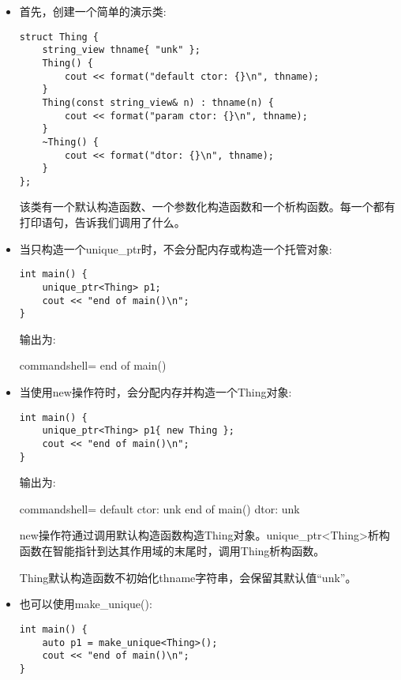 \begin{itemize}
\item 
首先，创建一个简单的演示类:

\begin{lstlisting}[style=styleCXX]
struct Thing {
	string_view thname{ "unk" };
	Thing() {
		cout << format("default ctor: {}\n", thname);
	}
	Thing(const string_view& n) : thname(n) {
		cout << format("param ctor: {}\n", thname);
	}
	~Thing() {
		cout << format("dtor: {}\n", thname);
	}
};
\end{lstlisting}

该类有一个默认构造函数、一个参数化构造函数和一个析构函数。每一个都有打印语句，告诉我们调用了什么。

\item 
当只构造一个unique\_ptr时，不会分配内存或构造一个托管对象:

\begin{lstlisting}[style=styleCXX]
int main() {
	unique_ptr<Thing> p1;
	cout << "end of main()\n";
}
\end{lstlisting}

输出为:

\begin{tcblisting}{commandshell={}}
end of main()
\end{tcblisting}


\item 
当使用new操作符时，会分配内存并构造一个Thing对象:

\begin{lstlisting}[style=styleCXX]
int main() {
	unique_ptr<Thing> p1{ new Thing };
	cout << "end of main()\n";
}
\end{lstlisting}

输出为:

\begin{tcblisting}{commandshell={}}
default ctor: unk
end of main()
dtor: unk
\end{tcblisting}

new操作符通过调用默认构造函数构造Thing对象。unique\_ptr<Thing>析构函数在智能指针到达其作用域的末尾时，调用Thing析构函数。

Thing默认构造函数不初始化thname字符串，会保留其默认值“unk”。

\item 
也可以使用make\_unique():

\begin{lstlisting}[style=styleCXX]
int main() {
	auto p1 = make_unique<Thing>();
	cout << "end of main()\n";
}
\end{lstlisting}


\end{itemize}
